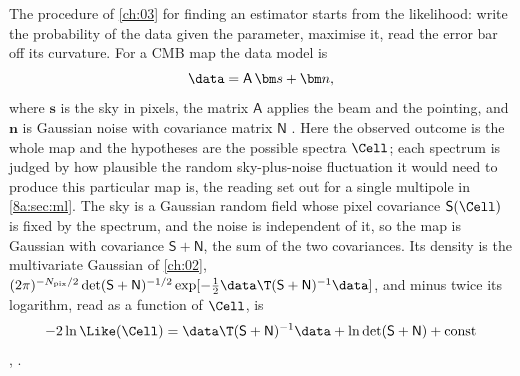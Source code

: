 The procedure of \cref{ch:03} for finding an estimator starts from the likelihood: write
the probability of the data given the parameter, maximise it, read the error bar off its
curvature. For a CMB map the data model is
\begin{equation}
  \data = \mathsf A\,\bm s + \bm n ,
  \label{8a:eq:hobson-model}
\end{equation}
where $\bm s$ is the sky in pixels, the matrix $\mathsf A$ applies the beam and the
pointing, and $\bm n$ is Gaussian noise with covariance matrix $\mathsf N$
. Here the observed outcome is the whole map and the
hypotheses are the possible spectra $\Cell$; each spectrum is judged by how plausible the
random sky-plus-noise fluctuation it would need to produce this particular map is, the reading
set out for a single multipole in \cref{8a:sec:ml}. The sky is a Gaussian random field whose pixel covariance
$\mathsf S(\Cell)$ is fixed by the spectrum, and the noise is independent of it, so the map is
Gaussian with covariance $\mathsf S+\mathsf N$, the sum of the two covariances. Its density is the
multivariate Gaussian of \cref{ch:02},
$(2\pi)^{-N_{\rm pix}/2}\det(\mathsf S+\mathsf N)^{-1/2}\exp[-\frac12\data\T(\mathsf S+\mathsf N)^{-1}\data]$,
and minus twice its logarithm, read as a function of $\Cell$, is
\begin{equation}
  -2\ln\Like(\Cell)=\data\T(\mathsf S+\mathsf N)^{-1}\data+\ln\det(\mathsf S+\mathsf N)+\text{const}
  \label{8a:eq:pixel-like}
\end{equation}
, \cite{Efstathiou2004}.

